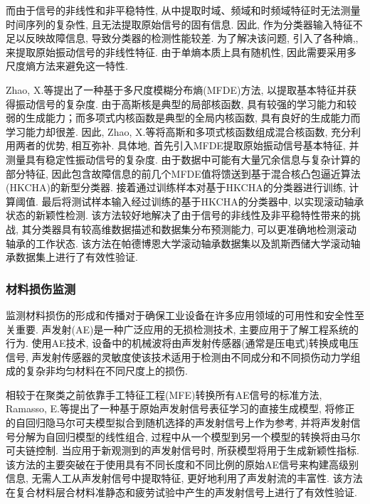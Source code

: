 \documentclass{Style/aas}
\begin{document}
\begin{multicols}{2}
  而由于信号的非线性和非平稳特性, 从中提取时域、频域和时频域特征时无法测量时间序列的复杂性, 且无法提取原始信号的固有信息. 因此, 作为分类器输入特征不足以反映故障信息, 导致分类器的检测性能较差. 为了解决该问题, 引入了各种熵\cite{sadooghi2018improving},\cite{zhang2018fuzzy},\cite{aktaruzzaman2014parametric}来提取原始振动信号的非线性特征. 由于单熵本质上具有随机性, 因此需要采用多尺度熵方法来避免这一特性\cite{li2016fault}.

  Zhao, X.等\cite{zhao2020novelty}提出了一种基于多尺度模糊分布熵(MFDE)方法, 以提取基本特征并获得振动信号的复杂度. 由于高斯核是典型的局部核函数, 具有较强的学习能力和较弱的生成能力；而多项式内核函数是典型的全局内核函数\cite{ding2013novel}, 具有良好的生成能力而学习能力却很差. 因此, Zhao, X.等将高斯和多项式核函数组成混合核函数, 充分利用两者的优势, 相互弥补. 具体地, 首先引入MFDE提取原始振动信号基本特征, 并测量具有稳定性振动信号的复杂度. 由于数据中可能有大量冗余信息与复杂计算的部分特征, 因此包含故障信息的前几个MFDE值将馈送到基于混合核凸包逼近算法(HKCHA)的新型分类器. 接着通过训练样本对基于HKCHA的分类器进行训练, 计算阈值. 最后将测试样本输入经过训练的基于HKCHA的分类器中, 以实现滚动轴承状态的新颖性检测. 该方法较好地解决了由于信号的非线性及非平稳特性带来的挑战, 其分类器具有较高维数据描述和数据集分布预测能力, 可以更准确地检测滚动轴承的工作状态. 该方法在帕德博恩大学滚动轴承数据集以及凯斯西储大学滚动轴承数据集上进行了有效性验证.


  \subsubsection{材料损伤监测}
  监测材料损伤的形成和传播对于确保工业设备在许多应用领域的可用性和安全性至关重要. 声发射(AE)是一种广泛应用的无损检测技术, 主要应用于了解工程系统的行为. 使用AE技术, 设备中的机械波将由声发射传感器(通常是压电式)转换成电压信号, 声发射传感器的灵敏度使该技术适用于检测由不同成分和不同损伤动力学组成的复杂非均匀材料在不同尺度上的损伤.

  相较于在聚类之前依靠手工特征工程(MFE)转换所有AE信号的标准方法, Ramasso, E.等\cite{ramasso2020learning}提出了一种基于原始声发射信号表征学习的直接生成模型, 将修正的自回归隐马尔可夫模型拟合到随机选择的声发射信号上作为参考, 并将声发射信号分解为自回归模型的线性组合, 过程中从一个模型到另一个模型的转换将由马尔可夫链控制. 当应用于新观测到的声发射信号时, 所获模型将用于生成新颖性指标. 该方法的主要突破在于使用具有不同长度和不同比例的原始AE信号来构建高级别信息, 无需人工从声发射信号中提取特征, 更好地利用了声发射流的丰富性. 该方法在复合材料层合材料准静态和疲劳试验中产生的声发射信号上进行了有效性验证.


\end{multicols}
\end{document}
